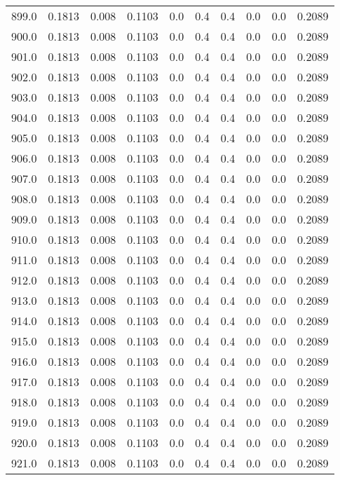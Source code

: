 \begin{longtable}{lrrrrrrrrr}
899.0 & 0.1813 & 0.008 & 0.1103 & 0.0 & 0.4 & 0.4 & 0.0 & 0.0 & 0.2089 \\
900.0 & 0.1813 & 0.008 & 0.1103 & 0.0 & 0.4 & 0.4 & 0.0 & 0.0 & 0.2089 \\
901.0 & 0.1813 & 0.008 & 0.1103 & 0.0 & 0.4 & 0.4 & 0.0 & 0.0 & 0.2089 \\
902.0 & 0.1813 & 0.008 & 0.1103 & 0.0 & 0.4 & 0.4 & 0.0 & 0.0 & 0.2089 \\
903.0 & 0.1813 & 0.008 & 0.1103 & 0.0 & 0.4 & 0.4 & 0.0 & 0.0 & 0.2089 \\
904.0 & 0.1813 & 0.008 & 0.1103 & 0.0 & 0.4 & 0.4 & 0.0 & 0.0 & 0.2089 \\
905.0 & 0.1813 & 0.008 & 0.1103 & 0.0 & 0.4 & 0.4 & 0.0 & 0.0 & 0.2089 \\
906.0 & 0.1813 & 0.008 & 0.1103 & 0.0 & 0.4 & 0.4 & 0.0 & 0.0 & 0.2089 \\
907.0 & 0.1813 & 0.008 & 0.1103 & 0.0 & 0.4 & 0.4 & 0.0 & 0.0 & 0.2089 \\
908.0 & 0.1813 & 0.008 & 0.1103 & 0.0 & 0.4 & 0.4 & 0.0 & 0.0 & 0.2089 \\
909.0 & 0.1813 & 0.008 & 0.1103 & 0.0 & 0.4 & 0.4 & 0.0 & 0.0 & 0.2089 \\
910.0 & 0.1813 & 0.008 & 0.1103 & 0.0 & 0.4 & 0.4 & 0.0 & 0.0 & 0.2089 \\
911.0 & 0.1813 & 0.008 & 0.1103 & 0.0 & 0.4 & 0.4 & 0.0 & 0.0 & 0.2089 \\
912.0 & 0.1813 & 0.008 & 0.1103 & 0.0 & 0.4 & 0.4 & 0.0 & 0.0 & 0.2089 \\
913.0 & 0.1813 & 0.008 & 0.1103 & 0.0 & 0.4 & 0.4 & 0.0 & 0.0 & 0.2089 \\
914.0 & 0.1813 & 0.008 & 0.1103 & 0.0 & 0.4 & 0.4 & 0.0 & 0.0 & 0.2089 \\
915.0 & 0.1813 & 0.008 & 0.1103 & 0.0 & 0.4 & 0.4 & 0.0 & 0.0 & 0.2089 \\
916.0 & 0.1813 & 0.008 & 0.1103 & 0.0 & 0.4 & 0.4 & 0.0 & 0.0 & 0.2089 \\
917.0 & 0.1813 & 0.008 & 0.1103 & 0.0 & 0.4 & 0.4 & 0.0 & 0.0 & 0.2089 \\
918.0 & 0.1813 & 0.008 & 0.1103 & 0.0 & 0.4 & 0.4 & 0.0 & 0.0 & 0.2089 \\
919.0 & 0.1813 & 0.008 & 0.1103 & 0.0 & 0.4 & 0.4 & 0.0 & 0.0 & 0.2089 \\
920.0 & 0.1813 & 0.008 & 0.1103 & 0.0 & 0.4 & 0.4 & 0.0 & 0.0 & 0.2089 \\
921.0 & 0.1813 & 0.008 & 0.1103 & 0.0 & 0.4 & 0.4 & 0.0 & 0.0 & 0.2089 \\

\end{longtable}
